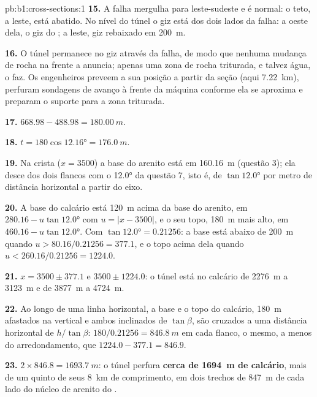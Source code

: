 \begin{solution}{pb:b1:cross-sections:1}
\textbf{15.} A falha mergulha para leste-sudeste e é normal: o teto, a leste, está abatido. No nível do túnel o giz está dos dois lados da falha: a oeste dela, o giz do ; a leste, giz rebaixado em \qty{200}{m}.

\textbf{16.} O túnel permanece no giz através da falha, de modo que nenhuma mudança de rocha na frente a anuncia; apenas uma zona de rocha triturada, e talvez água, o faz. Os engenheiros preveem a sua posição a partir da seção (aqui \qty{7.22}{km}), perfuram sondagens de avanço à frente da máquina conforme ela se aproxima e preparam o suporte para a zona triturada.

\textbf{17.} $668.98 - 488.98 = \qty{180.00}{m}$.

\textbf{18.} $t = 180\cos\ang{12.16} = \qty{176.0}{m}$.

\textbf{19.} Na crista ($x = 3500$) a base do arenito está em
\qty{160.16}{m} (questão 3); ela desce dos dois flancos com o 
\ang{12.0} da questão 7, isto é, de $\tan\ang{12.0}$ por metro de
distância horizontal a partir do eixo.

\textbf{20.} A base do calcário está \qty{120}{m} acima da base do
arenito, em $280.16 - u\tan\ang{12.0}$ com $u = |x - 3500|$, e o seu topo,
\qty{180}{m} mais alto, em $460.16 - u\tan\ang{12.0}$. Com $\tan\ang{12.0} =
0.21256$: a base está abaixo de \qty{200}{m} quando $u > 80.16/0.21256 = 377.1$,
e o topo acima dela quando $u < 260.16/0.21256 = 1224.0$.

\textbf{21.} $x = 3500 \pm 377.1$ e $3500 \pm 1224.0$: o túnel está no calcário
de \qty{2276}{m} a \qty{3123}{m} e de \qty{3877}{m} a \qty{4724}{m}.

\textbf{22.} Ao longo de uma linha horizontal, a base e o topo do calcário, \qty{180}{m} afastados na vertical e ambos inclinados de $\tan\beta$, são cruzados a uma distância horizontal de $h/\tan\beta$: $180/0.21256 = \qty{846.8}{m}$ em cada
flanco, o mesmo, a menos do arredondamento, que $1224.0 - 377.1 = 846.9$.

\textbf{23.} $2\times846.8 = \qty{1693.7}{m}$: o túnel perfura
\textbf{cerca de \qty[text-series-to-math=true]{1694}{m} de calcário}, mais de um quinto de seus
\qty{8}{km} de comprimento, em dois trechos de \qty{847}{m} de cada lado do núcleo de arenito do .
\end{solution}
